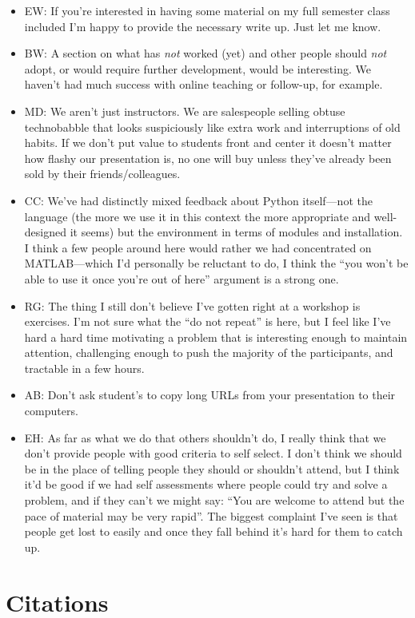 \documentclass{article}
\begin{document}
\begin{itemize}

  \item EW: If you're interested in having some material on my full
    semester class included I'm happy to provide the necessary write
    up. Just let me know.

  \item BW: A section on what has {\em not} worked (yet) and other people
    should {\em not} adopt, or would require further development, would
    be interesting. We haven't had much success with online teaching or
    follow-up, for example.

  \item MD: We aren't just instructors. We are salespeople selling
    obtuse technobabble that looks suspiciously like extra work and
    interruptions of old habits. If we don't put value to students
    front and center it doesn't matter how flashy our presentation is,
    no one will buy unless they've already been sold by their
    friends/colleagues.

  \item CC: We've had distinctly mixed feedback about Python
    itself---not the language (the more we use it in this context the
    more appropriate and well-designed it seems) but the environment
    in terms of modules and installation. I think a few people around
    here would rather we had concentrated on MATLAB---which I'd
    personally be reluctant to do, I think the ``you won't be able to
    use it once you're out of here'' argument is a strong one.

  \item RG: The thing I still don't believe I've gotten right at a
    workshop is exercises. I'm not sure what the ``do not repeat'' is
    here, but I feel like I've hard a hard time motivating a problem
    that is interesting enough to maintain attention, challenging
    enough to push the majority of the participants, and tractable in
    a few hours.

  \item AB: Don't ask student's to copy long URLs from your
    presentation to their computers.

  \item EH: As far as what we do that others shouldn't do, I really
    think that we don't provide people with good criteria to self
    select.  I don't think we should be in the place of telling people
    they should or shouldn't attend, but I think it'd be good if we
    had self assessments where people could try and solve a problem,
    and if they can't we might say: ``You are welcome to attend but
    the pace of material may be very rapid''.  The biggest complaint
    I've seen is that people get lost to easily and once they fall
    behind it's hard for them to catch up.

\end{itemize}

\section{Citations}

\cite{hannay2009} \cite{prabhu2011} \cite{wilson1996}
\cite{wilson2006a} \cite{wilson2006b} \cite{wilson2009}



\end{document}
